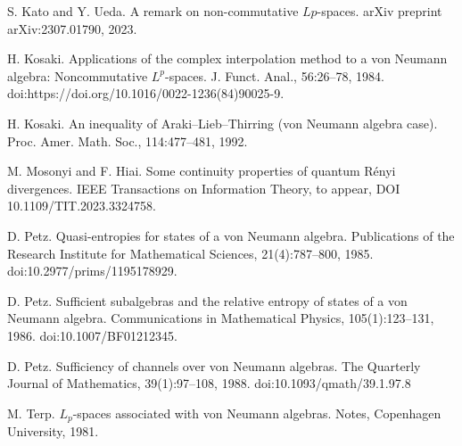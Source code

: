 \documentclass[12pt]{article}
\theoremstyle{definition}
\theoremstyle{remark}
\numberwithin{equation}{section}
\begin{document}
\begin{thebibliography}{99}
S. Kato and Y. Ueda. A remark on non-commutative $Lp$-spaces. arXiv preprint
arXiv:2307.01790, 2023.

H. Kosaki. Applications of the complex interpolation method to a von Neumann algebra: Noncommutative
$L^p$-spaces. J. Funct. Anal., 56:26--78, 1984. doi:https://doi.org/10.1016/0022-1236(84)90025-9.

H. Kosaki. An inequality of Araki--Lieb--Thirring (von Neumann algebra case).
Proc. Amer. Math. Soc., 114:477--481, 1992.

M. Mosonyi and F. Hiai. Some continuity properties of quantum R\'enyi divergences.
IEEE Transactions on Information Theory, to appear, DOI 10.1109/TIT.2023.3324758.

D. Petz. Quasi-entropies for states of a von Neumann algebra. Publications of the Research
Institute for Mathematical Sciences, 21(4):787--800, 1985. doi:10.2977/prims/1195178929.

D. Petz. Sufficient subalgebras and the relative entropy of states of a von Neumann algebra.
Communications in Mathematical Physics, 105(1):123--131, 1986. doi:10.1007/BF01212345.

D. Petz. Sufficiency of channels over von Neumann algebras. The Quarterly Journal of
Mathematics, 39(1):97–108, 1988. doi:10.1093/qmath/39.1.97.8

M. Terp. $L_p$-spaces associated with von Neumann algebras. Notes, Copenhagen University,
1981.
\end{thebibliography}
\end{document}
